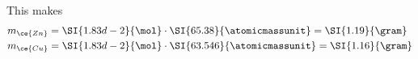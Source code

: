 \documentclass[../mit-general-chemistry.tex]{subfiles}
\begin{document}
\begin{example}
\begin{enumerate}[label=\arabic*)]
      This makes
      \begin{align*}
        &m_{\ce{Zn}}
        = \SI{1.83d-2}{\mol} \cdot \SI{65.38}{\atomicmassunit}
        = \SI{1.19}{\gram} \\
        &m_{\ce{Cu}}
        = \SI{1.83d-2}{\mol} \cdot \SI{63.546}{\atomicmassunit}
        = \SI{1.16}{\gram} \\
      \end{align*}
  \end{enumerate}
\end{example}
\end{document}
